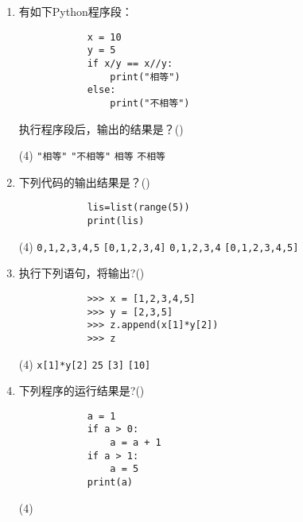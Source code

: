 \documentclass[11pt]{ctexart}
\begin{document}
\begin{enumerate}
        \newpage
        \item 有如下Python程序段：
        \begin{lstlisting}
            x = 10
            y = 5
            if x/y == x//y:    
                print("相等")
            else:    
                print("不相等")
        \end{lstlisting}
        执行程序段后，输出的结果是？(\qquad)
        \begin{tasks}(4)
            \task \lstinline{"相等"}
            \task \lstinline{"不相等"}
            \task \lstinline!相等!
            \task \lstinline!不相等!
        \end{tasks}

        \item  下列代码的输出结果是？(\qquad)
        \begin{lstlisting}
            lis=list(range(5))
            print(lis)
        \end{lstlisting}
        \begin{tasks}(4)
            \task \lstinline!0,1,2,3,4,5!
            \task \lstinline![0,1,2,3,4]!
            \task \lstinline!0,1,2,3,4!
            \task \lstinline![0,1,2,3,4,5]!
        \end{tasks}

        \item  执行下列语句，将输出?(\qquad)
        \begin{lstlisting}
            >>> x = [1,2,3,4,5]
            >>> y = [2,3,5]
            >>> z.append(x[1]*y[2])
            >>> z
        \end{lstlisting}
        \begin{tasks}(4)
            \task \lstinline!x[1]*y[2]!
            \task \lstinline!25!
            \task \lstinline![3]!
            \task \lstinline![10]!
        \end{tasks}

        \item 下列程序的运行结果是?(\qquad)
        \begin{lstlisting}
            a = 1
            if a > 0:
                a = a + 1
            if a > 1:
                a = 5
            print(a)
        \end{lstlisting}
        \begin{tasks}(4)
        \end{tasks}
        

\end{enumerate}
\end{document}
